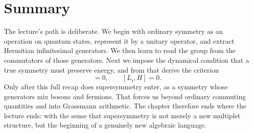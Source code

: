 \section{Summary}

The lecture's path is deliberate. We begin with ordinary symmetry as an operation on quantum states, represent it by a unitary operator, and extract Hermitian infinitesimal generators. We then learn to read the group from the commutators of those generators. Next we impose the dynamical condition that a true symmetry must preserve energy, and from that derive the criterion
\begin{equation}
[U,H]=0,
\qquad
[L_i,H]=0.
\end{equation}
Only after this full recap does supersymmetry enter, as a symmetry whose generators mix bosons and fermions. That forces us beyond ordinary commuting quantities and into Grassmann arithmetic. The chapter therefore ends where the lecture ends: with the sense that supersymmetry is not merely a new multiplet structure, but the beginning of a genuinely new algebraic language.